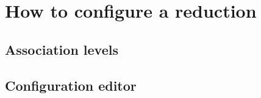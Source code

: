 \section{How to configure a reduction}
\label{sec:configure_a_reduction}

\subsection{Association levels}
\label{sec:association_levels}



\subsection{Configuration editor}
\label{configuration_editor}


